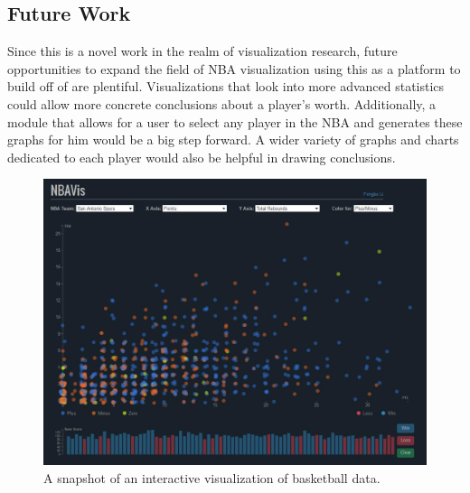 \documentclass[journal]{vgtc}                %
\begin{document}
\subsection{Future Work}
Since this is a novel work in the realm of visualization research, future opportunities to expand the field of NBA visualization using this as a platform to build off of are plentiful. Visualizations that look into more advanced statistics could allow more concrete conclusions about a player's worth. Additionally, a module that allows for a user to select any player in the NBA and generates these graphs for him would be a big step forward. A wider variety of graphs and charts dedicated to each player would also be helpful in drawing conclusions.
\newpage



\newpage

\begin{figure}[h]
\caption{A snapshot of an interactive visualization of basketball data.}
\includegraphics[width=\linewidth]{georgiatech.jpg}
\end{figure}
\end{document}
